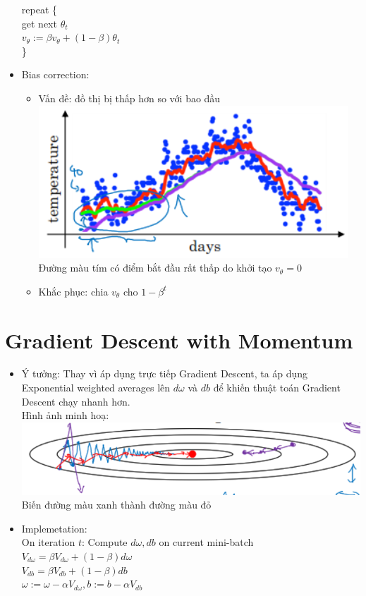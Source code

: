 \documentclass[12pt,a4paper]{report}
\begin{document}
\begin{itemize}
				repeat \{ \\
				\tabto{0.5cm} get next $\theta_t$ \\ 
				\tabto{0.5cm} $ v_\theta := \beta v_\theta + (1 - \beta) \theta_t $ \\
				\}	
			\item Bias correction:
				\begin{itemize}
					\item Vấn đề: đồ thị bị thấp hơn so với bao đầu \\
					\includegraphics[scale=0.8]{2} \\
 					\tabto{0.5cm} Đường màu tím có điểm bắt đầu rất thấp do khởi tạo $ v_\theta = 0 $
 					\item Khắc phục: chia $ v_\theta $ cho $ 1 - \beta^t $
				\end{itemize}
		\end{itemize}
	\section{Gradient Descent with Momentum}
		\begin{itemize}
			\item Ý tưởng: Thay vì áp dụng trực tiếp Gradient Descent, ta áp dụng Exponential weighted averages lên $d\omega$ và $db$ để khiến thuật toán Gradient Descent chạy nhanh hơn.\\
				\tabto{0.5cm} Hình ảnh minh hoạ: \\\includegraphics[scale=0.6]{3} \\
				\tabto{0.5cm} Biến đường màu xanh thành đường màu đỏ
			\item Implemetation: \\
				On iteration $t$:
				\tabto{0.5cm} Compute $ d\omega, db $ on current mini-batch \\
				\tabto{0.5cm} $ V_{d\omega} = \beta V_{d\omega} + (1 - \beta) d\omega $ \\
				\tabto{0.5cm} $ V_{db} = \beta V_{db} + (1 - \beta) db $ \\
				\tabto{0.5cm} $ \omega := \omega - \alpha V_{d\omega}, b := b - \alpha V_{db} $ \\
		\end{itemize}
\end{document}
